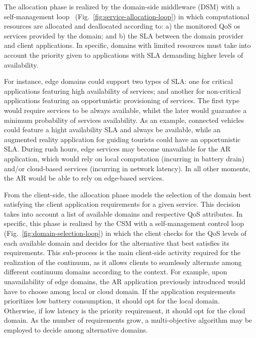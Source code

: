 The allocation phase is realized by the domain-side middleware (DSM) with a self-management loop~\cite{kephart2003vision} (Fig.~\ref{fig:service-allocation-loop}) in which computational resources are allocated and deallocated according to: a) the monitored QoS os services provided by the domain; and b) the SLA between the domain provider and client applications. In specific, domains with limited resources must take into account the priority given to applications with SLA demanding higher levels of availability. 

For instance, edge domains could support two types of SLA: one for critical applications featuring high availability of services; and another for non-critical applications featuring an opportunistic provisioning of services. The first type would require services to be always available, whilst the later would guarantee a minimum probability of services availability. As an example, connected vehicles could feature a hight availability SLA and always be available, while an augmented reality application for guiding tourists could have an opportunistic SLA. During rush hours, edge services may become unavailable for the AR application, which would rely on local computation (incurring in battery drain) and/or cloud-based services (incurring in network latency). In all other moments, the AR would be able to rely on edge-based services. 


From the client-side, the allocation phase models the selection of the domain best satisfying the client application requirements for a given service. This decision takes into account a list of available domains and respective QoS attributes. In specific, this phase is realized by the CSM with a self-management control loop (Fig.~\ref{fig:domain-selection-loop}) in which the client checks for the QoS levels of each available domain and decides for the alternative that best satisfies its requirements. This sub-process is the main client-side activity required for the realization of the continuum, as it allows clients to seamlessly alternate among different continuum domains according to the context. For example, upon unavailability of edge domains, the AR application previously introduced would have to choose among local or cloud domain. If the application requirements prioritizes low battery consumption, it should opt for the local domain. Otherwise, if low latency is the priority requirement, it should opt for the cloud domain. As the number of requirements grow, a multi-objective algorithm may be employed to decide among alternative domains.



